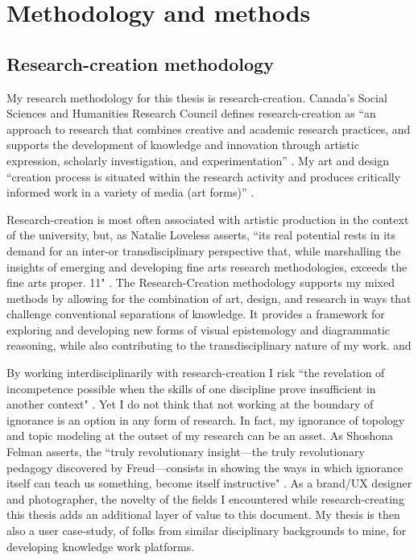 \chapter{Methodology and methods}
\section{Research-creation methodology}

My research methodology for this thesis is research-creation. Canada’s Social Sciences and Humanities Research Council defines research-creation as ``an approach to research that combines creative and academic research practices, and supports the development of knowledge and innovation through artistic expression, scholarly investigation, and experimentation” \citep{government_of_canada_research-creation_2021}. My art and design “creation process is situated within the research activity and produces critically informed work in a variety of media (art forms)” \citep{government_of_canada_research-creation_2021}.

Research-creation is most often associated with artistic production in the context of the university, but, as Natalie Loveless asserts, ``its real potential rests in its demand for an inter-­or transdisciplinary perspective that, while marshalling the insights of emerging and developing fine arts research methodologies, exceeds the fine arts proper. 11" \citep[p. 6-7]{loveless_how_2019-1}. The Research-Creation methodology supports my mixed methods by allowing for the combination of art, design, and research in ways that challenge conventional separations of knowledge. It provides a framework for exploring and developing new forms of visual epistemology and diagrammatic reasoning, while also contributing to the transdisciplinary nature of my work.
 and 

By working interdisciplinarily with research-creation I risk ``the revelation of incompetence possible when the skills of one discipline prove insufficient in another context" \citep[p. 45]{loveless_how_2019-1}. Yet I do not think that not working at the boundary of ignorance is an option in any form of research. In fact, my ignorance of topology and topic modeling at the outset of my research can be an asset. As Shoshona Felman asserts, the ``truly revolutionary insight—the truly revolutionary pedagogy discovered by Freud—consists in showing the ways in which ignorance itself can teach us something, become itself instructive" \cite[p. 79]{felman_jacques_1987} \citep[p. 38]{loveless_how_2019-1}. As a brand/UX designer and photographer, the novelty of the fields I encountered while research-creating this thesis adds an additional layer of value to this document. My thesis is then also a user case-study, of folks from similar disciplinary backgrounds to mine, for developing knowledge work platforms. 

